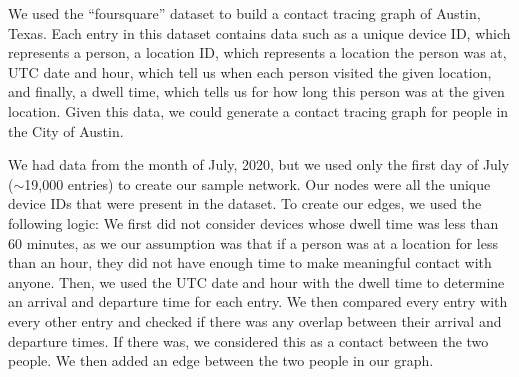 \documentclass[times, 10pt,twocolumn]{article}
\begin{document}














We used the ``foursquare'' dataset to build a contact tracing graph of Austin, Texas. Each entry in this dataset contains data such as a unique device ID, which represents a person, a location ID, which represents a location the person was at, UTC date and hour, which tell us when each person visited the given location, and finally, a dwell time, which tells us for how long this person was at the given location. Given this data, we could generate a contact tracing graph for people in the City of Austin.

We had data from the month of July, 2020, but we used only the first day of July ($\sim$19,000 entries) to create our sample network. Our nodes were all the unique device IDs that were present in the dataset. To create our edges, we used the following logic: We first did not consider devices whose dwell time was less than 60 minutes, as we our assumption was that if a person was at a location for less than an hour, they did not have enough time to make meaningful contact with anyone. Then, we used the UTC date and hour with the dwell time to determine an arrival and departure time for each entry. We then compared every entry with every other entry and checked if there was any overlap between their arrival and departure times. If there was, we considered this as a contact between the two people. We then added an edge between the two people in our graph.
\end{document}
